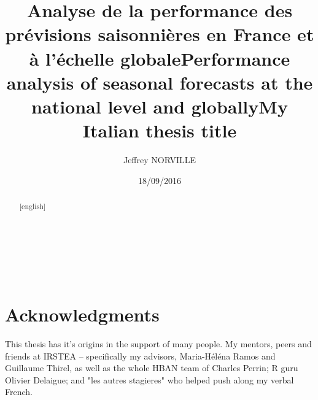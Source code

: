 \documentclass[logos,parttoc,morelanguage=french,morelanguage=italian]{orsay-memoire}
\author{Jeffrey \textsc{NORVILLE}}
\title{Analyse de la performance des prévisions saisonnières en France et à l'échelle globale}
\title[english]{Performance analysis of seasonal forecasts at the national level and globally}
\title[italian]{My Italian thesis title}
\date{18/09/2016} %
\begin{document}

\maketitle%

\pagestyle{empty}


\begin{abstract}
\dummytext
\end{abstract}

\noindent\hspace*{0.35\textwidth}\hrulefill\hspace*{0.35\textwidth}\\[-\bigskipamount]

\begin{abstract}[english]
\dummytext
\end{abstract}



\noindent\hspace*{0.35\textwidth}\hrulefill\hspace*{0.35\textwidth}\\[-\bigskipamount]



\pagebreak\strut\newpage

\section*{Acknowledgments}
\vfill
This thesis has it's origins in the support of many people. My mentors, peers and friends at IRSTEA -- specifically my advisors, Maria-Héléna Ramos and Guillaume Thirel, as well as the whole HBAN team of Charles Perrin; R guru Olivier Delaigue; and "les autres stagieres" who helped push along my verbal French.
\end{document}
